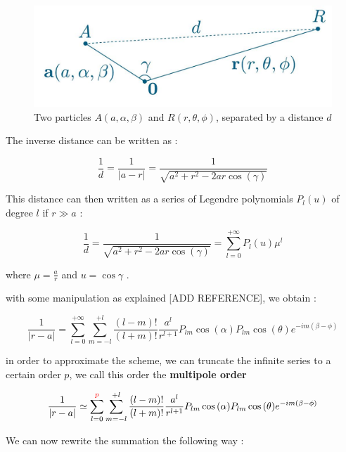 \documentclass[12pt,twoside,a4paper]{report}
\begin{document}
	
\begin{figure}[H]
\includegraphics[scale=0.4]{distance}
 \centering 
\caption{Two particles $A(a,\alpha,\beta)$ and $R(r,\theta,\phi)$, separated by a distance $d$}
\label{fig:poster}
\end{figure}	
	
	
	The inverse distance can be written as :
	
	\begin{equation*}
		\frac{1}{d} = \frac{1}{|a-r|} = \frac{1}{\sqrt{a^2 + r^2 - 2ar \cos(\gamma)}}
	\end{equation*}

	This distance can then written as a series of Legendre polynomials  $P_l(u)$ of degree $l$ if $r \gg a$ :
	
	\begin{equation}
		\frac{1}{d} = \frac{1}{\sqrt{a^2 + r^2 - 2ar \cos(\gamma)}} = \sum\limits_{l=0}^{+\infty} P_l(u)\mu^l
	\end{equation}
	
	
	where $\mu = \frac{a}{r}$ and $u = \cos{\gamma}$ .
	
	with some manipulation as explained [ADD REFERENCE], we obtain : 
	
	\begin{equation}
	\frac{1}{|r - a|} = \sum\limits_{l=0}^{+\infty} \sum\limits_{m = -l}^{+l} \frac{(l-m)!}{(l+m)!} \frac{a^l}{r^{l+1}} P_{lm}\cos{(\alpha)}P_{lm}\cos{(\theta)}e^{-im(\beta - \phi)}
	\end{equation}
	
	in order to approximate the scheme, we can truncate the infinite series to a certain order $p$, we call this order the \textbf{multipole order}
	
	\begin{equation}
	\frac{1}{|r - a|} \simeq \sum\limits_{l=0}^{\textcolor{red}{p}} \sum\limits_{m = -l}^{+l} \frac{(l-m)!}{(l+m)!} \frac{a^l}{r^{l+1}} P_{lm}\cos{(\alpha)}P_{lm}\cos{(\theta)}e^{-im(\beta - \phi)}
	\end{equation}
	
	We can now rewrite the summation the following way :
	
\end{document}
